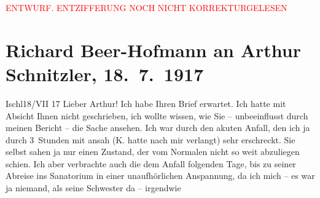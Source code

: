 
\begin{center}
            \textcolor{red}{ENTWURF. ENTZIFFERUNG NOCH NICHT KORREKTURGELESEN}
                      \end{center}
            
               \section[Richard Beer-Hofmann an Arthur Schnitzler, 18. 7. 1917]{ Richard Beer-Hofmann an Arthur Schnitzler, 18. 7. 1917}\nopagebreak{}\rehead{ }\begin{ledgroupsized}[t]{13cm}\normalsize\beginnumbering{} \toendnotes[C]{\smallbreak\pagebreak[2]} 
\toendnotes[C]{\smallbreak}\pstart
           \raggedleft{}{\pb}Ischl18/VII 17\pend
           \pstart
           Lieber Arthur! Ich habe Ihren Brief erwartet. Ich hatte mit Absicht
               Ihnen nicht geschrieben, ich wollte wissen, wie Sie – unbeeinflusst durch meinen
               Bericht – die Sache ansehen. Ich war durch den akuten Anfall, den ich ja durch
               3 Stunden mit ansah (K. hatte nach mir verlangt)
               sehr erschreckt. Sie selbst sahen ja nur einen Zustand, der vom Normalen nicht so
               weit abzuliegen schien. Ich aber verbrachte auch die dem Anfall folgenden Tage, bis
               zu seiner Abreise ins Sanatorium
               in einer unaufhörlichen Anspannung, da ich mich – es war ja niemand, als seine Schwester da – irgendwie

\end{ledgroupsized}

